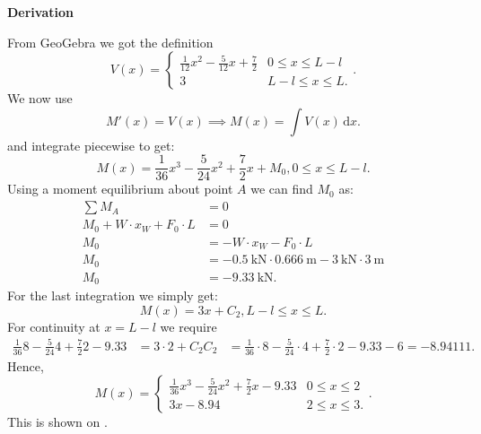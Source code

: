\documentclass[a4paper]{article}
\numberwithin{equation}{problem}
\newcommand{\AUheading}[1]{%
  \par\vspace{.4\baselineskip}%
  {\sffamily\bfseries\color{AUblueDark}#1\par}%
  \nobreak%
}
\newenvironment{derivation}[1][Derivation]{%
  \AUheading{#1}
  \begingroup\allowdisplaybreaks
  \setlength{\abovedisplayskip}{6pt}%
  \setlength{\belowdisplayskip}{6pt}%
  \setlength{\abovedisplayshortskip}{4pt}%
  \setlength{\belowdisplayshortskip}{4pt}%
}{\par\endgroup\medskip}
\begin{document}
\begin{derivation}
\begin{itemize}
          From GeoGebra we got the definition
          \begin{equation*}
            V(x) = \begin{cases}
             \frac{1}{12} x^2 - \frac{5}{12} x + \frac{7}{2}  & 0 \leq x \leq L-l\\
             3 & L-l \leq x \leq L 
            .\end{cases}
          .\end{equation*}
          We now use
          \begin{equation*}
            M'(x) = V(x) \implies M(x) = \int V(x) \, \mathrm{d}x 
          .\end{equation*}
          and integrate piecewise to get:
          \begin{equation*}
            M(x) = \frac{1}{36} x^3 - \frac{5}{24} x^2 + \frac{7}{2} x + M_0, 0 \leq x \leq L-l
          .\end{equation*}
          Using a moment equilibrium about point $A$ we can find $M_0$ as:
          \begin{align*}
            \sum M_A &= 0 \\
            M_0 + W \cdot x_W + F_0 \cdot L &= 0 \\
            M_0 &= - W \cdot x_W - F_0 \cdot L \\
            M_0 &=-\qty{0,5}{\kN}\cdot \qty{0,666}{\m} - \qty{3}{\kN} \cdot \qty{3}{\m} \\
            M_0 &= -\qty{9,33}{\kN}
          .\end{align*}
          For the last integration we simply get:
          \begin{equation*}
            M(x) = 3x + C_2, L-l \leq x \leq L
          .\end{equation*}
          For continuity at $x = L-l$ we require
          \begin{align*}
            \frac{1}{36} 8 - \frac{5}{24} 4 + \frac{7}{2} 2  - \num{9,33} &= 3 \cdot 2 + C_2
            C_2 &=  \frac{1}{36} \cdot 8 - \frac{5}{24} \cdot 4 + \frac{7}{2} \cdot 2 - \num{9.33}  - 6 = -8.94111
          .\end{align*}
          Hence,
          \begin{equation*}
            M(x) = \begin{cases}
              \frac{1}{36}x^3 - \frac{5}{24} x^2 + \frac{7}{2}x - \num{9,33} & 0 \leq x \leq 2\\
            3x - \num{8,94} & 2 \leq x \leq 3
            .\end{cases}
          .\end{equation*}
          This is shown on .


\end{itemize}
\end{derivation}
\end{document}
